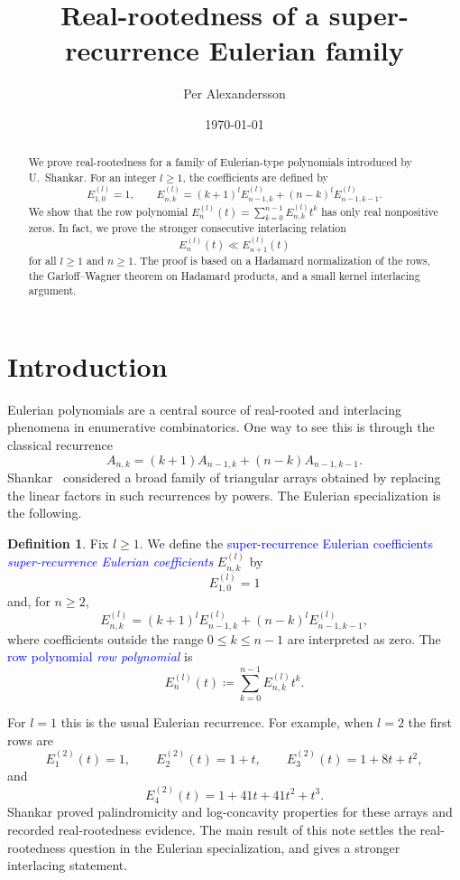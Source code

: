\documentclass[reqno]{amsart}
\title[Super-recurrence Eulerian polynomials]{Real-rootedness of a
super-recurrence Eulerian family}
\author{Per Alexandersson}
\date{\today}
\numberwithin{equation}{section}
\theoremstyle{definition}
\newtheorem{definition}[theorem]{Definition}
\newcommand{\defin}[1]{%
\relax\ifmmode%
\textcolor{blue}{#1}%
\else\textcolor{blue}{\emph{#1}}%
\fi%
}
\begin{document}
\begin{abstract}
We prove real-rootedness for a family of Eulerian-type polynomials introduced
by U.~Shankar.  For an integer $l\geq 1$, the coefficients are defined by
\[
  E_{1,0}^{(l)}=1,\qquad
  E_{n,k}^{(l)}
  =(k+1)^lE_{n-1,k}^{(l)}
  +(n-k)^lE_{n-1,k-1}^{(l)} .
\]
We show that the row polynomial
$E_n^{(l)}(t)=\sum_{k=0}^{n-1}E_{n,k}^{(l)}t^k$ has only real
nonpositive zeros.  In fact, we prove the stronger consecutive interlacing
relation
\[
  E_n^{(l)}(t)\ll E_{n+1}^{(l)}(t)
\]
for all $l\geq 1$ and $n\geq 1$.  The proof is based on a Hadamard
normalization of the rows, the Garloff--Wagner theorem on Hadamard products,
and a small kernel interlacing argument.
\end{abstract}

\maketitle

\section{Introduction}
\label{sec:introduction}

Eulerian polynomials are a central source of real-rooted and interlacing
phenomena in enumerative combinatorics.  One way to see this is through the
classical recurrence
\[
  A_{n,k}=(k+1)A_{n-1,k}+(n-k)A_{n-1,k-1}.
\]
Shankar~\cite{Shankar2025SuperRecurrence} considered a broad family of
triangular arrays obtained by replacing the linear factors in such recurrences
by powers.  The Eulerian specialization is the following.

\begin{definition}
\label{def:superEulerianRows}
Fix $l\geq 1$.  We define the \defin{super-recurrence Eulerian
coefficients} $E_{n,k}^{(l)}$ by
\[
  E_{1,0}^{(l)}=1
\]
and, for $n\geq 2$,
\begin{equation}
\label{eq:superEulerianRecurrence}
  E_{n,k}^{(l)}
  =(k+1)^lE_{n-1,k}^{(l)}
  +(n-k)^lE_{n-1,k-1}^{(l)} ,
\end{equation}
where coefficients outside the range $0\leq k\leq n-1$ are interpreted as
zero.  The \defin{row polynomial} is
\[
  E_n^{(l)}(t)
  \coloneqq
  \sum_{k=0}^{n-1}E_{n,k}^{(l)}t^k .
\]
\end{definition}

For $l=1$ this is the usual Eulerian recurrence.  For example, when $l=2$ the
first rows are
\[
  E_1^{(2)}(t)=1,\qquad
  E_2^{(2)}(t)=1+t,\qquad
  E_3^{(2)}(t)=1+8t+t^2,
\]
and
\[
  E_4^{(2)}(t)=1+41t+41t^2+t^3 .
\]
Shankar proved palindromicity and log-concavity properties for these arrays
and recorded real-rootedness evidence.  The main result of this note settles
the real-rootedness question in the Eulerian specialization, and gives a
stronger interlacing statement.
\end{document}
